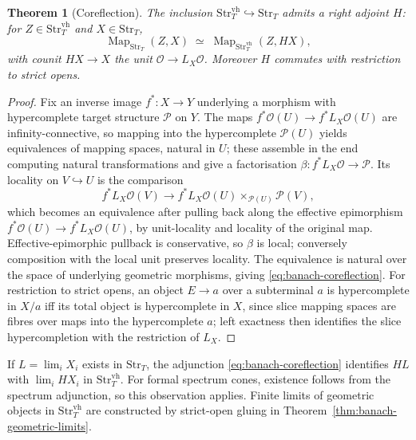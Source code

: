 \documentclass[12pt]{amsart}
\newtheorem{thm}{Theorem}[section]
\theoremstyle{definition}
\theoremstyle{remark}
\numberwithin{equation}{section}
\DeclareMathOperator{\Map}{Map}
\begin{document}
\begin{thm}[Coreflection]
\label{thm:banach-coreflection}
The inclusion
$\mathrm{Str}_T^{\mathrm{vh}}\hookrightarrow\mathrm{Str}_T$ admits a
right adjoint $H$: for $Z\in\mathrm{Str}_T^{\mathrm{vh}}$ and
$X\in\mathrm{Str}_T$,
\begin{equation}
\label{eq:banach-coreflection}
 \Map_{\mathrm{Str}_T}(Z,X)
 \;\simeq\;
 \Map_{\mathrm{Str}_T^{\mathrm{vh}}}(Z,HX),
\end{equation}
with counit $HX\to X$ the unit $\mathcal O\to L_X\mathcal O$.
Moreover $H$ commutes with restriction to strict opens.
\end{thm}

\begin{proof}
Fix an inverse image $f^{*}\colon X\to Y$ underlying a morphism with
hypercomplete target structure $\mathcal P$ on $Y$. The maps
$f^{*}\mathcal O(U)\to f^{*}L_X\mathcal O(U)$ are
infinity-connective, so mapping into the hypercomplete
$\mathcal P(U)$ yields equivalences of mapping spaces, natural in
$U$; these assemble in the end computing natural transformations and
give a factorisation $\beta\colon f^{*}L_X\mathcal O\to\mathcal P$.
Its locality on $V\hookrightarrow U$ is the comparison
\[
 f^{*}L_X\mathcal O(V)\longrightarrow
 f^{*}L_X\mathcal O(U)\times_{\mathcal P(U)}\mathcal P(V),
\]
which becomes an equivalence after pulling back along the effective
epimorphism $f^{*}\mathcal O(U)\to f^{*}L_X\mathcal O(U)$, by
unit-locality and locality of the original map. Effective-epimorphic
pullback is conservative, so $\beta$ is local; conversely
composition with the local unit preserves locality. The equivalence
is natural over the space of underlying geometric morphisms, giving
\eqref{eq:banach-coreflection}. For restriction to strict opens, an object
$E\to a$ over a subterminal $a$ is hypercomplete in $X/a$ iff its
total object is hypercomplete in $X$, since slice mapping spaces are
fibres over maps into the hypercomplete $a$; left exactness then
identifies the slice hypercompletion with the restriction of
$L_X$.
\end{proof}

If $L=\lim_i X_i$ exists in $\mathrm{Str}_T$, the adjunction
\eqref{eq:banach-coreflection} identifies $HL$ with
$\lim_i HX_i$ in $\mathrm{Str}_T^{\mathrm{vh}}$.
For formal spectrum cones, existence follows from the spectrum
adjunction, so this observation applies. Finite limits of
geometric objects in $\mathrm{Str}_T^{\mathrm{vh}}$ are constructed
by strict-open gluing in Theorem~\ref{thm:banach-geometric-limits}.
\end{document}
